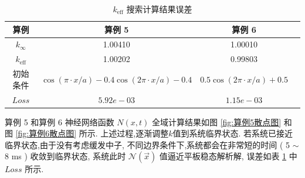 \documentclass{Sichuan Normal University}
\begin{document}
\begin{table}[H]
    \caption{$k_{\text{eff}}$ 搜索计算结果误差}
    \centering
    \begin{tabular}{cccc}
        \toprule
        \textbf{算例} & \textbf{算例 5} & \textbf{算例 6} \\
        \midrule
        $k_{\infty}$ & 1.00410 & 1.00010 \\
        $k_{\mathrm{eff}}$ & 1.00202 & 0.99803 \\
        初始条件 & $\cos (\pi \cdot x / a)-0.4 \cos (2 \pi \cdot x / a)-0.4$ & $0.5 \cos (2 \pi \cdot x / a)+0.5$ \\
        $Loss$ & $5.92e-03$ & $1.15e-03$ \\
      \bottomrule
    \end{tabular}
    \label{tab:k_eff_error}
\end{table}

算例 5 和算例 6 神经网络函数 $N(x, t)$ 全域计算结果如图 \ref{fig:算例5散点图} 和 图 \ref{fig:算例6散点图} 所示.
上述过程,逐渐调整$k$值到系统临界状态. 若系统已接近临界状态,由于没有考虑缓发中子, 不同边界条件下,系统都会在非常短的时间
( 5 $\sim$ 8 ms ) 收敛到临界状态, 系统此时 $\mathcal{N}(\vec{x})$ 值逼近平板稳态解析解, 误差如表 \ref{tab:k_eff_error} 中 $Loss$ 所示.
\end{document}
